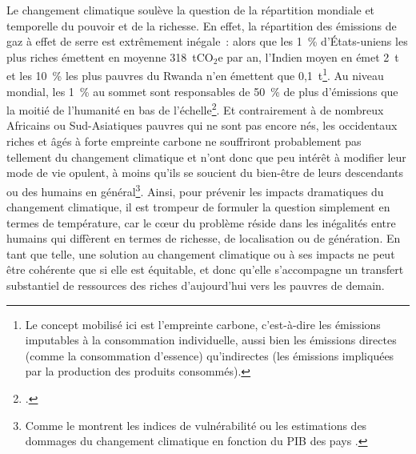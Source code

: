 \documentclass[a5paper,french,openany]{memoir}
\begin{document}
Le changement climatique soulève la question de la répartition mondiale et temporelle du pouvoir et de la richesse. %
En effet, la répartition des émissions de gaz à effet de serre est extrêmement inégale~: alors que les 1~\% d'États-uniens les plus riches émettent en moyenne 318~tCO$_\text{2}$e par an, l'Indien moyen en émet 2~t et les 10~\% les plus pauvres du Rwanda n'en émettent que 0,1~t\footnote{Le concept mobilisé ici est l'empreinte carbone, c'est-à-dire les émissions imputables à la consommation individuelle, aussi bien les émissions directes (comme la consommation d'essence) qu'indirectes (les émissions impliquées par la production des produits consommés).}. %
Au niveau mondial, les 1~\% au sommet sont responsables de 50~\% de plus d'émissions que la moitié de l'humanité en bas de l'échelle\footnote{\cite{chancel_carbon_2015,bruckner_impacts_2022}.}. 
Et contrairement à de nombreux Africains ou Sud-Asiatiques pauvres qui ne sont pas encore nés, les occidentaux riches et âgés à forte empreinte carbone ne souffriront probablement pas tellement du changement climatique et n'ont donc que peu intérêt à modifier leur mode de vie opulent, à moins qu'ils se soucient du bien-être de leurs descendants ou des humains en général\footnote{Comme le montrent les indices de vulnérabilité \citep{chen_university_2015} ou les estimations des dommages du changement climatique en fonction du PIB des pays \citep{burke_global_2015}.}. 
Ainsi, pour prévenir les impacts dramatiques du changement climatique, il est trompeur de formuler la question simplement en termes de température, %
car le cœur du problème réside dans les inégalités entre humains qui diffèrent en termes de richesse, de localisation ou de génération. En tant que telle, une solution au changement climatique ou à ses impacts ne peut être cohérente que si elle est équitable, et donc qu'elle s'accompagne un transfert substantiel de ressources des riches d'aujourd'hui vers les pauvres de demain. %
\end{document}
